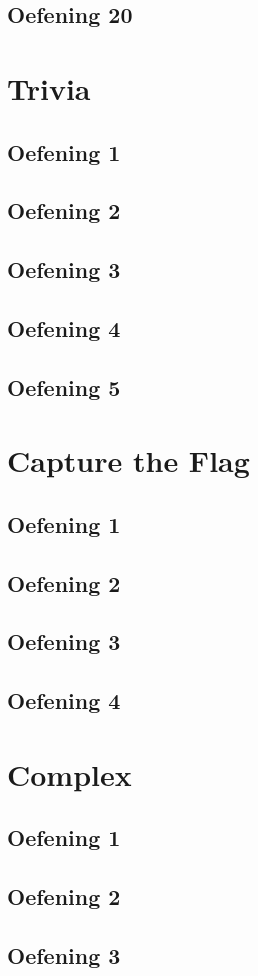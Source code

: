 \documentclass[a4paper,11pt]{report}
\begin{document}
\section{Oefening 20}

\newpage

\chapter{Trivia}
\section{Oefening 1}

\section{Oefening 2}

\section{Oefening 3}

\section{Oefening 4}

\section{Oefening 5}

\newpage

\chapter{Capture the Flag}
\section{Oefening 1}

\section{Oefening 2}

\section{Oefening 3}

\section{Oefening 4}

\newpage

\chapter{Complex}
\section{Oefening 1}

\section{Oefening 2}

\section{Oefening 3}

\newpage
\end{document}
